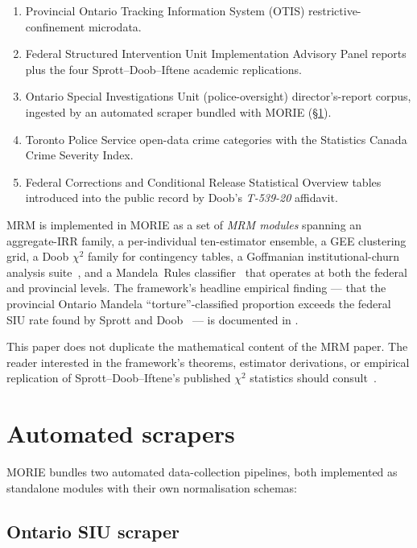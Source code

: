 \documentclass[11pt,a4paper]{article}
\theoremstyle{plain}
\theoremstyle{definition}
\theoremstyle{remark}
\begin{document}
\begin{enumerate}
\item Provincial Ontario Tracking Information System (OTIS)
      restrictive-confinement microdata.
\item Federal Structured Intervention Unit Implementation
      Advisory Panel reports plus the four Sprott--Doob--Iftene
      academic replications.
\item Ontario Special Investigations Unit (police-oversight)
      director's-report corpus, ingested by an automated scraper
      bundled with MORIE (\S\ref{sec:scrapers}).
\item Toronto Police Service open-data crime categories with the
      Statistics Canada Crime Severity Index.
\item Federal Corrections and Conditional Release Statistical
      Overview tables introduced into the public record by Doob's
      \emph{T-539-20} affidavit.
\end{enumerate}

MRM is implemented in MORIE as a set of \emph{MRM modules}
spanning an aggregate-IRR family, a per-individual ten-estimator
ensemble, a GEE clustering grid, a Doob $\chi^{2}$ family for
contingency tables, a Goffmanian institutional-churn analysis
suite~\cite{Goffman1961Asylums}, and a Mandela~Rules
classifier~\cite{UN2015Mandela} that operates at both the federal
and provincial levels. The framework's headline empirical finding
--- that the provincial Ontario Mandela ``torture''-classified
proportion exceeds the federal SIU rate found by Sprott and
Doob~\cite{SprottDoob2021Torture} --- is documented in
\cite{Ruhela2026MRM}.

This paper does not duplicate the mathematical content of the
MRM paper. The reader interested in the framework's theorems,
estimator derivations, or empirical replication of
Sprott--Doob--Iftene's published $\chi^{2}$ statistics should
consult~\cite{Ruhela2026MRM}.

\section{Automated scrapers}
\label{sec:scrapers}

MORIE bundles two automated data-collection pipelines, both
implemented as standalone modules with their own normalisation
schemas:

\subsection{Ontario SIU scraper}
\end{document}
